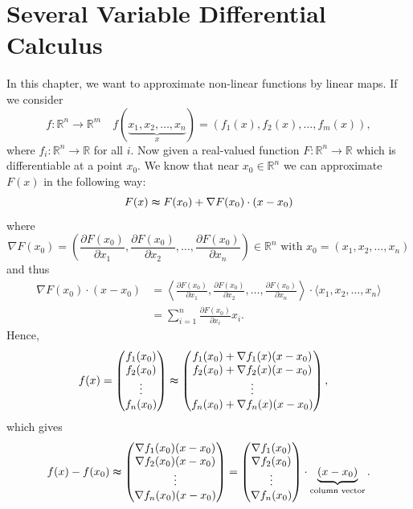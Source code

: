 \chapter{Several Variable Differential Calculus}

In this chapter, we want to approximate non-linear functions by linear maps. If we consider 
\[
    f: \mathbb{R} ^n \to \mathbb{R} ^m \quad f(\underbrace{x_1, x_2, \dots , x_n}_{x}) = \left( f_1(x), f_2(x), \dots , f_m(x) \right), 
\]
where \(f_i : \mathbb{R} ^n \to \mathbb{R} \) for all \(i\). Now given a real-valued function \(F: \mathbb{R} ^n \to \mathbb{R} \) which is differentiable at a point \(x_0\). We know that near \(x_0 \in \mathbb{R} ^n\) we can approximate \(F(x)\) in the following way: 
\[
    F(x) \thickapprox F(x_0) + \nabla F(x_0) \cdot (x - x_0)
\]     
where 
\[
    \nabla F(x_0) = \left( \frac{\partial F(x_0)}{\partial x_1}, \frac{\partial F(x_0)}{\partial x_2}, \dots , \frac{\partial F(x_0)}{\partial x_n}    \right) \in \mathbb{R} ^n \text{ with } x_0 = (x_1, x_2, \dots , x_n)
\]
and thus 
\begin{align*}
    \nabla F(x_0) \cdot (x - x_0) &= \left\langle \frac{\partial F(x_0)}{\partial x_1}, \frac{\partial F(x_0)}{\partial x_2}, \dots , \frac{\partial F(x_0)}{\partial x_n} \right\rangle \cdot \langle x_1, x_2, \dots , x_n \rangle \\
    &= \sum_{i=1}^n \frac{\partial F(x_0)}{\partial x_i} x_i.   
\end{align*}
Hence, 
\begin{align*}
    f(x) &= \begin{pmatrix}
         f_1(x_0) \\
         f_2(x_0) \\
         \vdots \\
         f_n(x_0) \\
    \end{pmatrix} \thickapprox \begin{pmatrix}
         f_1(x_0) + \nabla f_1(x) (x - x_0) \\
         f_2(x_0) + \nabla f_2(x) (x - x_0) \\
         \vdots \\
         f_n(x_0) + \nabla f_n(x) (x - x_0) \\
    \end{pmatrix},
\end{align*}
which gives 
\[
    f(x) - f(x_0) \thickapprox \begin{pmatrix}
        \nabla f_1(x_0) (x - x_0)  \\
        \nabla f_2(x_0) (x - x_0) \\
        \vdots \\
        \nabla f_n(x_0) (x - x_0) \\
    \end{pmatrix} = \begin{pmatrix}
         \nabla f_1(x_0) \\
         \nabla f_2(x_0) \\
         \vdots \\
         \nabla f_n(x_0) \\
    \end{pmatrix} \cdot \underbrace{(x - x_0)}_{\text{column vector}}.
\]
\newpage
